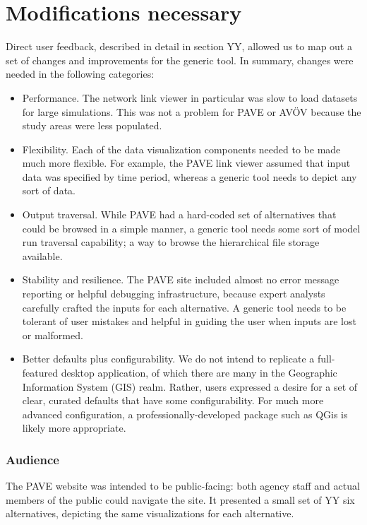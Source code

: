 \documentclass[3p,times,procedia]{elsarticle}
\begin{document}
\section{Modifications necessary}

Direct user feedback, described in detail in section YY, allowed us to
map out a set of changes and improvements for the generic tool. In
summary, changes were needed in the following categories:

\begin{itemize}
\item
  Performance. The network link viewer in particular was slow to load
  datasets for large simulations. This was not a problem for PAVE or
  AVÖV because the study areas were less populated.
\item
  Flexibility. Each of the data visualization components needed to be
  made much more flexible. For example, the PAVE link viewer assumed
  that input data was specified by time period, whereas a generic tool
  needs to depict any sort of data.
\item
  Output traversal. While PAVE had a hard-coded set of alternatives that
  could be browsed in a simple manner, a generic tool needs some sort of
  model run traversal capability; a way to browse the hierarchical file
  storage available.
\item
  Stability and resilience. The PAVE site included almost no error
  message reporting or helpful debugging infrastructure, because expert
  analysts carefully crafted the inputs for each alternative. A generic
  tool needs to be tolerant of user mistakes and helpful in guiding the
  user when inputs are lost or malformed.
\item
  Better defaults plus configurability. We do not intend to replicate a
  full-featured desktop application, of which there are many in the
  Geographic Information System (GIS) realm. Rather, users expressed a
  desire for a set of clear, curated defaults that have some
  configurability. For much more advanced configuration, a
  professionally-developed package such as QGis is likely more
  appropriate.
\end{itemize}

\subsubsection{Audience}

The PAVE website was intended to be public-facing: both agency staff and
actual members of the public could navigate the site. It presented a
small set of YY six alternatives, depicting the same visualizations for
each alternative.
\end{document}
